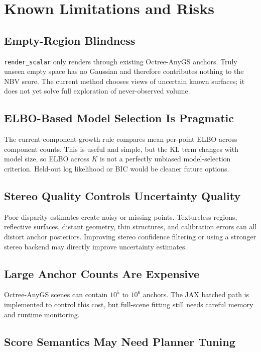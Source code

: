 \documentclass[11pt]{article}
\begin{document}
\section{Known Limitations and Risks}

\subsection{Empty-Region Blindness}

\texttt{render\_scalar} only renders through existing Octree-AnyGS anchors.
Truly unseen empty space has no Gaussian and therefore contributes nothing to
the NBV score. The current method chooses views of uncertain known surfaces; it
does not yet solve full exploration of never-observed volume.

\subsection{ELBO-Based Model Selection Is Pragmatic}

The current component-growth rule compares mean per-point ELBO across
component counts. This is useful and simple, but the KL term changes with
model size, so ELBO across \(K\) is not a perfectly unbiased model-selection
criterion. Held-out log likelihood or BIC would be cleaner future options.

\subsection{Stereo Quality Controls Uncertainty Quality}

Poor disparity estimates create noisy or missing points. Textureless regions,
reflective surfaces, distant geometry, thin structures, and calibration errors
can all distort anchor posteriors. Improving stereo confidence filtering or
using a stronger stereo backend may directly improve uncertainty estimates.

\subsection{Large Anchor Counts Are Expensive}

Octree-AnyGS scenes can contain \(10^5\) to \(10^6\) anchors. The JAX batched
path is implemented to control this cost, but full-scene fitting still needs
careful memory and runtime monitoring.

\subsection{Score Semantics May Need Planner Tuning}
\end{document}
